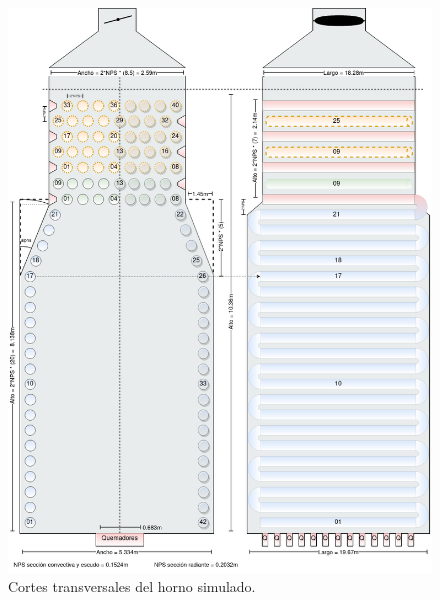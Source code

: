 \begin{figure}[H] \begin{center} \includegraphics[scale=0.4]{images/diagrama-vista}
\caption[Cortes transversales del horno]{Cortes transversales del horno simulado.}
\label{fig:diagrama-vista} \end{center} \end{figure}

